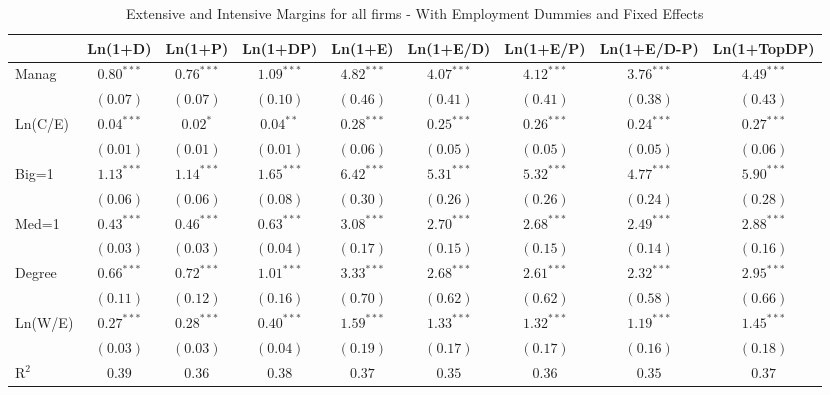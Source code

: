 \documentclass{article}
\begin{document}
\begin{table}
\caption{Extensive and Intensive Margins for all firms - With Employment Dummies and Fixed Effects}
\begin{center}
\begin{small}
\begin{tabular}{l c c c c c c c c}
\hline
 & Ln(1+D) & Ln(1+P) & Ln(1+DP) & Ln(1+E) & Ln(1+E/D) & Ln(1+E/P) & Ln(1+E/D-P) & Ln(1+TopDP) \\
\hline
Manag      & $0.80^{***}$ & $0.76^{***}$ & $1.09^{***}$ & $4.82^{***}$ & $4.07^{***}$ & $4.12^{***}$ & $3.76^{***}$ & $4.49^{***}$ \\
           & $(0.07)$     & $(0.07)$     & $(0.10)$     & $(0.46)$     & $(0.41)$     & $(0.41)$     & $(0.38)$     & $(0.43)$     \\
Ln(C/E)    & $0.04^{***}$ & $0.02^{*}$   & $0.04^{**}$  & $0.28^{***}$ & $0.25^{***}$ & $0.26^{***}$ & $0.24^{***}$ & $0.27^{***}$ \\
           & $(0.01)$     & $(0.01)$     & $(0.01)$     & $(0.06)$     & $(0.05)$     & $(0.05)$     & $(0.05)$     & $(0.06)$     \\
Big=1      & $1.13^{***}$ & $1.14^{***}$ & $1.65^{***}$ & $6.42^{***}$ & $5.31^{***}$ & $5.32^{***}$ & $4.77^{***}$ & $5.90^{***}$ \\
           & $(0.06)$     & $(0.06)$     & $(0.08)$     & $(0.30)$     & $(0.26)$     & $(0.26)$     & $(0.24)$     & $(0.28)$     \\
Med=1      & $0.43^{***}$ & $0.46^{***}$ & $0.63^{***}$ & $3.08^{***}$ & $2.70^{***}$ & $2.68^{***}$ & $2.49^{***}$ & $2.88^{***}$ \\
           & $(0.03)$     & $(0.03)$     & $(0.04)$     & $(0.17)$     & $(0.15)$     & $(0.15)$     & $(0.14)$     & $(0.16)$     \\
Degree     & $0.66^{***}$ & $0.72^{***}$ & $1.01^{***}$ & $3.33^{***}$ & $2.68^{***}$ & $2.61^{***}$ & $2.32^{***}$ & $2.95^{***}$ \\
           & $(0.11)$     & $(0.12)$     & $(0.16)$     & $(0.70)$     & $(0.62)$     & $(0.62)$     & $(0.58)$     & $(0.66)$     \\
Ln(W/E)    & $0.27^{***}$ & $0.28^{***}$ & $0.40^{***}$ & $1.59^{***}$ & $1.33^{***}$ & $1.32^{***}$ & $1.19^{***}$ & $1.45^{***}$ \\
           & $(0.03)$     & $(0.03)$     & $(0.04)$     & $(0.19)$     & $(0.17)$     & $(0.17)$     & $(0.16)$     & $(0.18)$     \\
\hline
R$^2$      & $0.39$       & $0.36$       & $0.38$       & $0.37$       & $0.35$       & $0.36$       & $0.35$       & $0.37$       \\

\end{tabular}
\end{small}
\end{center}
\end{table}
\end{document}
